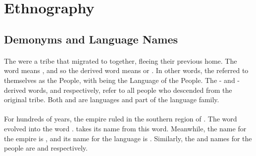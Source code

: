 \section{Ethnography}
\label{sec:tvk-ethnography}

\subsection{Demonyms and Language Names}
\label{subsec:tvk-demonyms}

\paragraph{\langtvk}

The \peoptvk{} were a tribe that migrated to \landn{} together, fleeing their previous home. The \langtvk{} word   means , and so the derived word \fw{\npeoptvk}  means  or . In other words, the \peoptvk{} referred to themselves as the People, with \fw{\nlangtvk} being the Language of the People. The \langank- and \langrdk-derived words,   and   respectively, refer to all people who descended from the original \peoptvk{} tribe. Both \langank{} and \langrdk{} are \peoptvk{} languages and part of the \langtvk{} language family.

\paragraph{\langank}

For hundreds of years, the empire ruled in the southern region of \landn. The \langtvk{} word    evolved into the \langank{} word  . \fw{\nlangank}   takes its name from this word. Meanwhile, the \langrdk{} name for the empire is  , and its name for the \langank{} language is  . Similarly, the \langank{} and \langrdk{} names for the \langank{} people are \fw{\npeopank}  and   respectively.

\paragraph{\langrdk}

